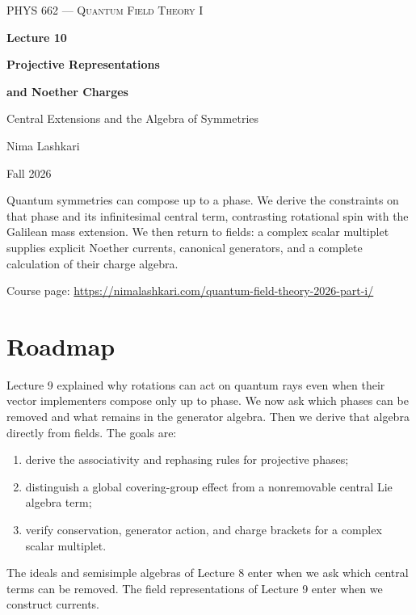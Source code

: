 \documentclass[11pt]{article}
\begin{document}
\begin{titlepage}
\centering
\vspace*{1.2in}
{\scshape\Large PHYS 662 --- Quantum Field Theory I\par}
\vspace{0.35in}
{\Huge\bfseries\color{qftblue} Lecture 10\par}
\vspace{0.15in}
{\LARGE\bfseries Projective Representations\par}
\vspace{0.06in}
{\LARGE\bfseries and Noether Charges\par}
\vspace{0.16in}
{\large\color{qftgreen} Central Extensions and the Algebra of Symmetries\par}
\vspace{0.6in}
{\large Nima Lashkari\par}
{\large Fall 2026\par}
\vfill
\begin{minipage}{0.86\textwidth}
\small
Quantum symmetries can compose up to a phase. We derive the constraints
on that phase and its infinitesimal central term, contrasting rotational
spin with the Galilean mass extension. We then return to fields: a
complex scalar multiplet supplies explicit Noether currents, canonical
generators, and a complete calculation of their charge algebra.

\medskip
Course page: \url{https://nimalashkari.com/quantum-field-theory-2026-part-i/}
\end{minipage}
\vspace{0.5in}
\end{titlepage}
\begingroup\small
\tableofcontents
\endgroup
\newpage
{}

\section*{Roadmap}
Lecture 9 explained why rotations can act on quantum rays even when
their vector implementers compose only up to phase. We now ask which
phases can be removed and what remains in the generator algebra. Then
we derive that algebra directly from fields. The goals are:
\begin{enumerate}
\item derive the associativity and rephasing rules for projective phases;
\item distinguish a global covering-group effect from a nonremovable
central Lie algebra term;
\item verify conservation, generator action, and charge brackets for a
complex scalar multiplet.
\end{enumerate}
The ideals and semisimple algebras of Lecture 8 enter when we ask which
central terms can be removed. The field representations of Lecture 9
enter when we construct currents.
\end{document}

